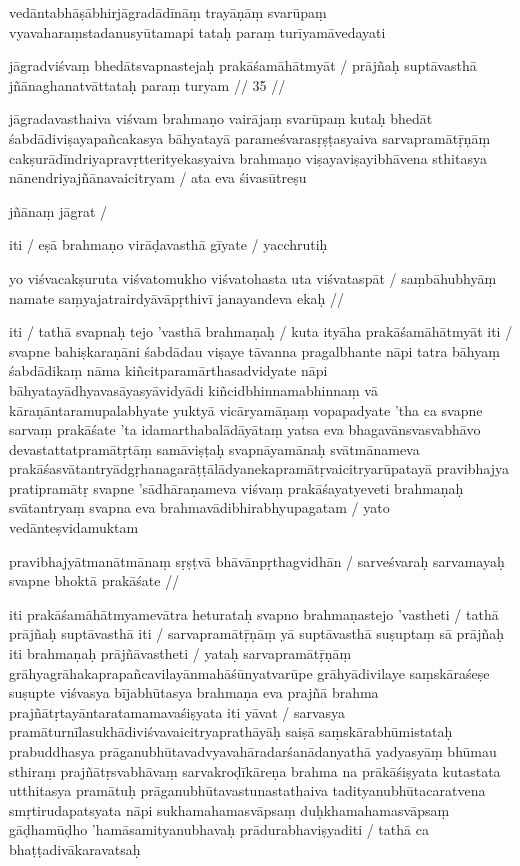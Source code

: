 vedāntabhāṣābhirjāgradādīnāṃ trayāṇāṃ svarūpaṃ vyavaharaṃstadanusyūtamapi tataḥ paraṃ turīyamāvedayati

jāgradviśvaṃ bhedātsvapnastejaḥ prakāśamāhātmyāt  /
prājñaḥ suptāvasthā jñānaghanatvāttataḥ paraṃ turyam  // 35  //

jāgradavasthaiva viśvam brahmaṇo vairājaṃ svarūpaṃ kutaḥ bhedāt śabdādiviṣayapañcakasya bāhyatayā parameśvarasṛṣṭasyaiva sarvapramātṝṇāṃ cakṣurādīndriyapravṛtterityekasyaiva brahmaṇo viṣayaviṣayibhāvena sthitasya nānendriyajñānavaicitryam  / ata eva śivasūtreṣu

jñānaṃ jāgrat  /

iti  / eṣā brahmaṇo virāḍavasthā gīyate  / yacchrutiḥ

yo viśvacakṣuruta viśvatomukho viśvatohasta uta viśvataspāt  /
saṃbāhubhyāṃ namate saṃyajatrairdyāvāpṛthivī janayandeva ekaḥ  //

iti  / tathā svapnaḥ tejo 'vasthā brahmaṇaḥ  / kuta ityāha prakāśamāhātmyāt iti  / svapne bahiṣkaraṇāni śabdādau viṣaye tāvanna pragalbhante nāpi tatra bāhyaṃ śabdādikaṃ nāma kiñcitparamārthasadvidyate nāpi bāhyatayādhyavasāyasyāvidyādi kiñcidbhinnamabhinnaṃ vā kāraṇāntaramupalabhyate yuktyā vicāryamāṇaṃ vopapadyate 'tha ca svapne sarvaṃ prakāśate 'ta idamarthabalādāyātaṃ yatsa eva bhagavānsvasvabhāvo devastattatpramātṛtāṃ samāviṣṭaḥ svapnāyamānaḥ svātmānameva prakāśasvātantryādgṛhanagarāṭṭālādyanekapramātṛvaicitryarūpatayā pravibhajya pratipramātṛ svapne 'sādhāraṇameva viśvaṃ prakāśayatyeveti brahmaṇaḥ svātantryaṃ svapna eva brahmavādibhirabhyupagatam  / yato vedānteṣvidamuktam

pravibhajyātmanātmānaṃ sṛṣṭvā bhāvānpṛthagvidhān  /
sarveśvaraḥ sarvamayaḥ svapne bhoktā prakāśate  //

iti prakāśamāhātmyamevātra heturataḥ svapno brahmaṇastejo 'vastheti  / tathā prājñaḥ suptāvasthā iti  / sarvapramātṝṇāṃ yā suptāvasthā suṣuptaṃ sā prājñaḥ iti brahmaṇaḥ prājñāvastheti  / yataḥ sarvapramātṝṇāṃ grāhyagrāhakaprapañcavilayānmahāśūnyatvarūpe grāhyādivilaye saṃskāraśeṣe suṣupte viśvasya bījabhūtasya brahmaṇa eva prajñā brahma prajñātṛtayāntaratamamavaśiṣyata iti yāvat  / sarvasya pramāturnīlasukhādiviśvavaicitryaprathāyāḥ saiṣā saṃskārabhūmistataḥ prabuddhasya prāganubhūtavadvyavahāradarśanādanyathā yadyasyāṃ bhūmau sthiraṃ prajñātṛsvabhāvaṃ sarvakroḍīkāreṇa brahma na prākāśiṣyata kutastata utthitasya pramātuḥ prāganubhūtavastunastathaiva tadityanubhūtacaratvena smṛtirudapatsyata nāpi sukhamahamasvāpsaṃ duḥkhamahamasvāpsaṃ gāḍhamūḍho 'hamāsamityanubhavaḥ prādurabhaviṣyaditi  / tathā ca bhaṭṭadivākaravatsaḥ

